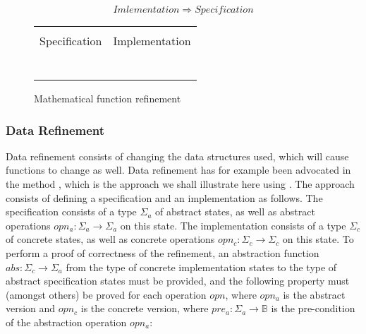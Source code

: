 \[
Imlementation \Rightarrow Specification
\]

\begin{figure}
  \centering
  \begin{tabular}[c]{c|c}
    \hline \\
    Specification & Implementation \\
    \hline\hline \\ \\
    \begin{subfigure}[c]{0.5\textwidth}
     
      \label{fig:prepost1}
    \end{subfigure}
    &
    \begin{subfigure}[c]{0.5\textwidth}
      
      \label{fig:prepost2}
    \end{subfigure}
    \\ \\
    \hline
  \end{tabular}    
  \caption{Mathematical function refinement}
  \label{fig:prepost}
\end{figure}

\subsubsection{Data Refinement}

Data refinement consists of changing the data structures used, which will
cause functions to change as well. Data refinement has for example been
advocated in the \vdm{} method \cite{vdm}, which is the approach we shall
illustrate here using \Klang. The approach consists of defining a specification 
and an implementation as follows. The specification consists of a type
$\Sigma_a$ of abstract states, as well as abstract operations $opn_a : \Sigma_a 
\rightarrow \Sigma_a$ on this state. The implementation consists of a type
$\Sigma_c$ of concrete states, as well as concrete operations $opn_c : \Sigma_c 
\rightarrow \Sigma_c$ on this state. To perform a proof of correctness of the 
refinement, an abstraction function $abs : \Sigma_c \rightarrow \Sigma_a$ from 
the type of concrete implementation states to the type of abstract specification 
states must be provided, and the following property must (amongst others) 
be proved for each operation $opn$, where $opn_a$ is the abstract version and $opn_c$ is the concrete version, where $pre_a : \Sigma_a \rightarrow \mathbb{B}$
is the pre-condition of the abstraction operation $opn_a$:

